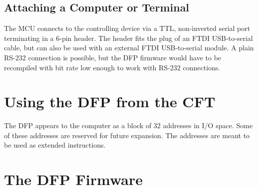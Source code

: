 \subsection{Attaching a Computer or Terminal}

The MCU connects to the controlling device via a TTL, non-inverted serial port
terminating in a 6-pin header. The header fits the plug of an FTDI
USB-to-serial cable, but can also be used with an external FTDI USB-to-serial
module. A plain RS-232 connection is possible, but the DFP firmware would have
to be recompiled with bit rate low enough to work with RS-232 connections.

\section{Using the DFP from the CFT}

The DFP appears to the computer as a block of 32 addresses in I/O space. Some
of these addresses are reserved for future expansion. The addresses are meant
to be used as \glspl{extended instruction}.

\section{The DFP Firmware}

